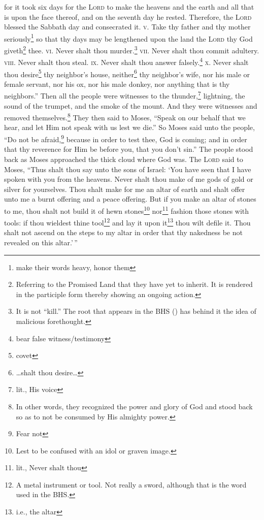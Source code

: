 \begin{inparaenum}
     for it took six days for the \textsc{Lord} to make the heavens and the earth and all that is upon the face thereof, and on the seventh day he rested. Therefore, the \textsc{Lord} blessed the Sabbath day and consecrated it.%
     \textsc{v.} Take thy father and thy mother seriously\footnote{make their words heavy, honor them} so that thy days may be lengthened upon the land the \textsc{Lord} thy God giveth\footnote{Referring to the Promised Land that they have yet to inherit. It is rendered in the participle form thereby showing an ongoing action.} thee.%
     \textsc{vi.} Never shalt thou murder.\footnote{It is not ``kill.'' The root that appears in the BHS () has behind it the idea of malicious forethought.}%
     \textsc{vii.} Never shalt thou commit adultery.%
     \textsc{viii.} Never shalt thou steal.%
     \textsc{ix.} Never shalt thou answer falsely.\footnote{bear false witness/testimony}%
     \textsc{x.} Never shalt thou desire\footnote{covet} thy neighbor's house, neither\footnote{\dots shalt thou desire\dots} thy neighbor's wife, nor his male or female servant, nor his ox, nor his male donkey, nor anything that is thy neighbors.''%
     Then all the people were witnesses to the thunder,\footnote{lit., His voice} lightning, the sound of the trumpet, and the smoke of the mount. And they were witnesses and removed themselves.\footnote{In other words, they recognized the power and glory of God and stood back so as to not be consumed by His almighty power.}%
     They then said to Moses, ``Speak on our behalf that we hear, and let Him not speak with us lest we die.''%
     So Moses said unto the people, ``Do not be afraid,\footnote{Fear not} because in order to test thee, God is coming; and in order that thy reverence for Him be before you, that you don't sin.''%
     The people stood back as Moses approached the thick cloud where God was.%
     The \textsc{Lord} said to Moses, ``Thus shalt thou say unto the sons of Israel: `You have seen that I have spoken with you from the heavens.%
     Never shalt thou make of me gods of gold or silver for yourselves.%
     Thou shalt make for me an altar of earth and shalt offer unto me a burnt offering and a peace offering.%
     But if you make an altar of stones to me, thou shalt not build it of hewn stones\footnote{Lest to be confused with an idol or graven image.} nor\footnote{lit., Never shalt thou} fashion those stones with tools: if thou wieldest thine tool\footnote{A metal instrument or tool. Not really a sword, although that is the word used in the BHS.} and lay it upon it\footnote{i.e., the altar} thou wilt defile it.%
     Thou shalt not ascend on the steps to my altar in order that thy nakedness be not revealed on this altar.'\,''%
\end{inparaenum}
